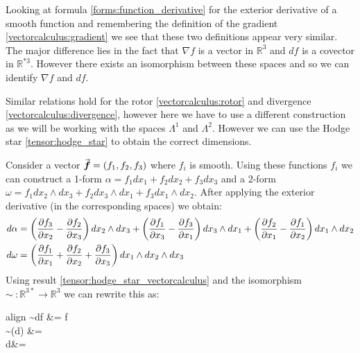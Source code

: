 Looking at formula \ref{forms:function_derivative} for the exterior derivative of a smooth function and remembering the definition of the gradient \ref{vectorcalculus:gradient} we see that these two definitions appear very similar. The major difference lies in the fact that $\nabla f$ is a vector in $\mathbb{R}^3$ and $df$ is a covector in $\mathbb{R}^{*3}$. However there exists an isomorphism between these spaces and so we can identify $\nabla f$ and $df$.
		
		Similar relations hold for the rotor \ref{vectorcalculus:rotor} and divergence \ref{vectorcalculus:divergence}, however here we have to use a different construction as we will be working with the spaces $\Lambda^1$ and $\Lambda^2$. However we can use the Hodge star \ref{tensor:hodge_star} to obtain the correct dimensions.
		
		Consider a vector $\vec{\boldsymbol{f}} = (f_1, f_2, f_3)$ where $f_i$ is smooth. Using these functions $f_i$ we can construct a 1-form $\alpha = f_1dx_1 + f_2dx_2 + f_3dx_3$ and a 2-form $\omega = f_1dx_2\wedge dx_3 + f_2dx_3\wedge dx_1 + f_3 dx_1\wedge dx_2$. After applying the exterior derivative (in the corresponding spaces) we obtain:
		\begin{align}
			d\alpha &= \left(\frac{\partial f_3}{\partial x_2} - \frac{\partial f_2}{\partial x_3}\right)dx_2\wedge dx_3 + \left(\frac{\partial f_1}{\partial x_3} - \frac{\partial f_3}{\partial x_1}\right)dx_3\wedge dx_1 + \left(\frac{\partial f_2}{\partial x_1} - \frac{\partial f_1}{\partial x_2}\right)dx_1\wedge dx_2 \nonumber\\
			d\omega &= \left(\frac{\partial f_1}{\partial x_1} + \frac{\partial f_2}{\partial x_2} + \frac{\partial f_3}{\partial x_3}\right)dx_1\wedge dx_2\wedge dx_3 \nonumber
		\end{align}
		Using result \ref{tensor:hodge_star_vectorcalculus} and the isomorphism $\sim\ :\mathbb{R}^{3*}\rightarrow\mathbb{R}^3$ we can rewrite this as:
		\begin{empheq}[box=\fbox]{align}
			\sim df &= \nabla f \\
			\sim (\ast d\alpha) &= \nabla\times{} \\
			\ast d\omega &= \nabla\cdot{}
		\end{empheq}